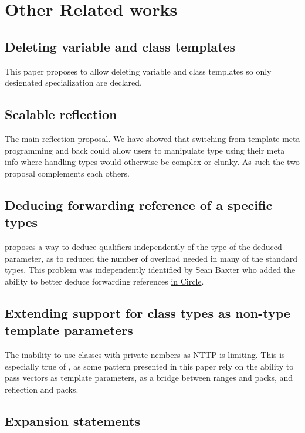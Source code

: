 \documentclass{wg21}
\begin{document}
\section{Other Related works}

\subsection{ Deleting variable and class templates}

This paper proposes to allow deleting variable and class templates so only designated specialization are declared.

\subsection{ Scalable reflection}

The main reflection proposal. We have showed that switching from template meta programming and back could allow users to manipulate type using their meta info where handling types would otherwise be complex or clunky. As such the two proposal complements each others.

\subsection{ Deducing forwarding reference of a specific types}

 proposes a way to deduce qualifiers independently of the type of the deduced parameter, as to reduced the number of overload needed in many of the standard types.
This problem was independently identified by Sean Baxter who added the ability to better deduce forwarding references \href{https://github.com/seanbaxter/circle/tree/master/tuple#deduced-forward-references}{in Circle}.

\subsection{ Extending support for class types as non-type template parameters}

The inability to use classes with private nembers as NTTP is limiting.
This is especially true of , as some pattern presented in this paper rely on the ability to pass vectors as template parameters,
as a bridge between ranges and packs, and reflection and packs.

\subsection{ Expansion statements}
\end{document}
